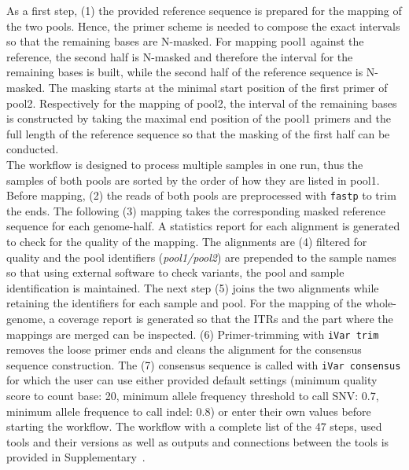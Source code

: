 As a first step, (1) the provided reference sequence is prepared for the mapping of the two pools. Hence, the primer scheme is needed to compose the exact intervals so that the remaining bases are N-masked. For mapping pool1 against the reference, the second half is N-masked and therefore the interval for the remaining bases is built, while the second half of the reference sequence is N-masked. The masking starts at the minimal start position of the first primer of pool2. Respectively for the mapping of pool2, the interval of the remaining bases is constructed by taking the maximal end position of the pool1 primers and the full length of the reference sequence so that the masking of the first half can be conducted. \\
The workflow is designed to process multiple samples in one run, thus the samples of both pools are sorted by the order of how they are listed in pool1. Before mapping, (2) the reads of both pools are preprocessed with \texttt{fastp} to trim the ends. The following (3) mapping takes the corresponding masked reference sequence for each genome-half. A statistics report for each alignment is generated to check for the quality of the mapping. The alignments are (4) filtered for quality and the pool identifiers (\textit{pool1/pool2}) are prepended to the sample names so that using external software to check variants, the pool and sample identification is maintained. The next step (5) joins the two alignments while retaining the identifiers for each sample and pool. For the mapping of the whole-genome, a coverage report is generated so that the \acp{ITR} and the part where the mappings are merged can be inspected. (6) Primer-trimming with \texttt{iVar trim} removes the loose primer ends and cleans the alignment for the consensus sequence construction. The (7) consensus sequence is called with \texttt{iVar consensus} for which the user can use either provided default settings (minimum quality score to count base: 20, minimum allele frequency threshold to call SNV: 0.7, minimum allele frequence to call indel: 0.8) or enter their own values before starting the workflow. The workflow with a complete list of the 47 steps, used tools and their versions as well as outputs and connections between the tools is provided in Supplementary~. 

